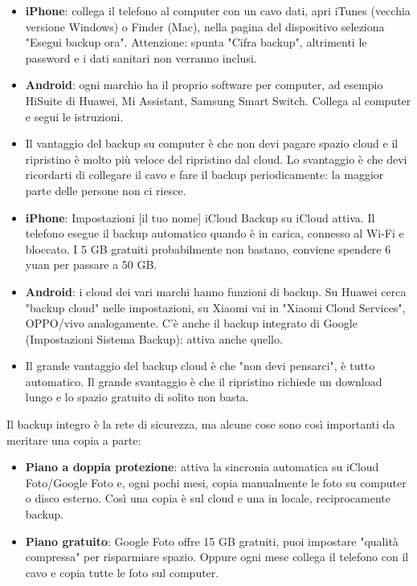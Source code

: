 \begin{itemize}
  \item \textbf{iPhone}: collega il telefono al computer con un cavo dati, apri iTunes (vecchia versione Windows) o Finder (Mac), nella pagina del dispositivo seleziona "Esegui backup ora". Attenzione: spunta "Cifra backup", altrimenti le password e i dati sanitari non verranno inclusi.
  \item \textbf{Android}: ogni marchio ha il proprio software per computer, ad esempio HiSuite di Huawei, Mi Assistant, Samsung Smart Switch. Collega al computer e segui le istruzioni.
  \item Il vantaggio del backup su computer è che non devi pagare spazio cloud e il ripristino è molto più veloce del ripristino dal cloud. Lo svantaggio è che devi ricordarti di collegare il cavo e fare il backup periodicamente: la maggior parte delle persone non ci riesce.
\end{itemize}


\begin{itemize}
  \item \textbf{iPhone}: Impostazioni [il tuo nome] iCloud Backup su iCloud attiva. Il telefono esegue il backup automatico quando è in carica, connesso al Wi-Fi e bloccato. I 5 GB gratuiti probabilmente non bastano, conviene spendere 6 yuan per passare a 50 GB.
  \item \textbf{Android}: i cloud dei vari marchi hanno funzioni di backup. Su Huawei cerca "backup cloud" nelle impostazioni, su Xiaomi vai in "Xiaomi Cloud Services", OPPO/vivo analogamente. C'è anche il backup integrato di Google (Impostazioni Sistema Backup): attiva anche quello.
  \item Il grande vantaggio del backup cloud è che "non devi pensarci", è tutto automatico. Il grande svantaggio è che il ripristino richiede un download lungo e lo spazio gratuito di solito non basta.
\end{itemize}


Il backup integro è la rete di sicurezza, ma alcune cose sono così importanti da meritare una copia a parte:


\begin{itemize}
  \item \textbf{Piano a doppia protezione}: attiva la sincronia automatica su iCloud Foto/Google Foto e, ogni pochi mesi, copia manualmente le foto su computer o disco esterno. Così una copia è sul cloud e una in locale, reciprocamente backup.
  \item \textbf{Piano gratuito}: Google Foto offre 15 GB gratuiti, puoi impostare "qualità compressa" per risparmiare spazio. Oppure ogni mese collega il telefono con il cavo e copia tutte le foto sul computer.
\end{itemize}

